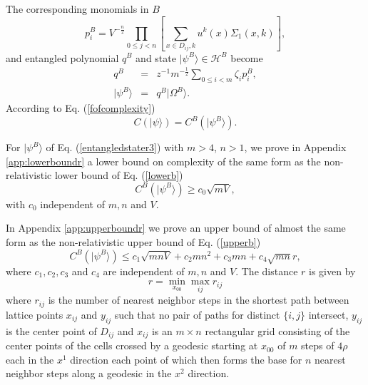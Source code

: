 \documentclass[12pt,amsmath,amssymb,onecolumn]{revtex4-2}
\begin{document}
The corresponding monomials in $B$ 
\begin{equation}
\label{pstatesrb}
p^B_i = 
V^{-\frac{n}{2}}\prod_{0 \le j <n} \left[\sum_{x \in D_{ij}, k} u^k(x) \Sigma_1( x,k )\right],
\end{equation}
and entangled polynomial $q^B$ and state $|\psi^B \rangle  \in \mathcal{H}^B$ become
\begin{subequations}
\begin{eqnarray}
\label{entangledstater2}
q^B &=& z^{-1} m^{-\frac{1}{2}}\sum_{0 \le i < m} \zeta_i p^B_i, \\ 
\label{entangledstater3}
|\psi^B \rangle   &=&  q^B|\Omega^B \rangle .
\end{eqnarray}
\end{subequations}
According to Eq. (\ref{fofcomplexity})
\begin{equation}
  \label{cofrelpsi}
  C( |\psi \rangle ) = C^B( |\psi^B \rangle ).
\end{equation}

For $|\psi^B \rangle $ of Eq. (\ref{entangledstater3})
with $m > 4$, $n > 1$,
we prove in Appendix \ref{app:lowerboundr} a lower bound on complexity
of the same form as the non-relativistic lower bound of Eq. (\ref{lowerb})
\begin{equation}
\label{lowerbr}
C^B( |\psi^B \rangle ) \geq c_0 \sqrt{ m V},
\end{equation}
with $c_0$ independent of $m, n$ and $V$.

In Appendix \ref{app:upperboundr} we prove an
upper bound of almost the same form as the non-relativistic upper bound of Eq. (\ref{upperb})
\begin{equation}
\label{upperbr}
C^B( |\psi^B \rangle ) \leq c_1 \sqrt{m n V} + c_2 m n^2 + c_3 m n + c_4\sqrt{mn} r,
\end{equation}
where $c_1, c_2, c_3$ and $c_4$ are independent of $m, n$ and $V$.
The distance $r$ is given by
\begin{equation}
  \label{defsbar1}
  r = \min_{x_{00}} \max_{ij} r_{ij}
\end{equation}
where $r_{ij}$ is the number of nearest
neighbor steps in the
shortest path between
lattice points $x_{ij}$ and $y_{ij}$
such that no pair of paths for distinct
$\{i, j\}$ intersect,
$y_{ij}$ is the center point of $D_{ij}$
and $x_{ij}$ is an $m \times n$ rectangular grid
consisting of the center points of
the cells crossed by a geodesic starting at $x_{00}$ of $m$ steps of
$4 \rho$ each in the $x^1$ direction each
point of which then forms the base for 
$n$ nearest neighbor steps along a geodesic in
the $x^2$ direction.
\end{document}
